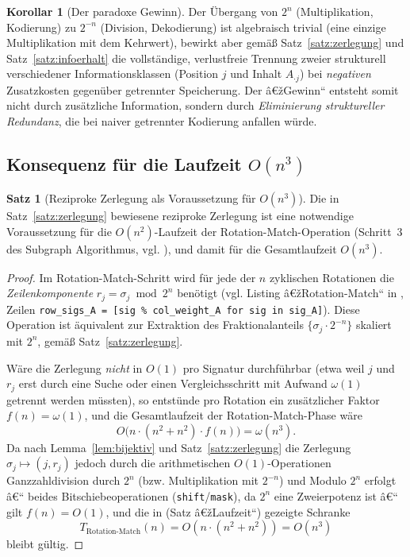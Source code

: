 ﻿\documentclass[a4paper,12pt]{article}
\theoremstyle{definition}
\newtheorem{satz}{Satz}
\newtheorem{korollar}{Korollar}
\begin{document}
\begin{korollar}[Der paradoxe Gewinn]
\label{kor:paradox}
	Der Übergang von $2^n$ (Multiplikation, Kodierung) zu $2^{-n}$
	(Division, Dekodierung) ist algebraisch trivial (eine einzige
	Multiplikation mit dem Kehrwert), bewirkt aber gemäß
	Satz~\ref{satz:zerlegung} und Satz~\ref{satz:infoerhalt} die vollständige,
	verlustfreie Trennung zweier strukturell verschiedener Informationsklassen
	(Position $j$ und Inhalt $A_{\cdot j}$) bei \emph{negativen} Zusatzkosten
	gegenüber getrennter Speicherung. Der â€žGewinn`` entsteht somit nicht durch
	zusätzliche Information, sondern durch \emph{Eliminierung struktureller
	Redundanz}, die bei naiver getrennter Kodierung anfallen würde.
\end{korollar}

\subsection{Konsequenz für die Laufzeit $O(n^3)$}

\begin{satz}[Reziproke Zerlegung als Voraussetzung für $O(n^3)$]
\label{satz:laufzeitkonsequenz}
	Die in Satz~\ref{satz:zerlegung} bewiesene reziproke Zerlegung ist eine
	notwendige Voraussetzung für die $O(n^2)$-Laufzeit der
	Rotation-Match-Operation (Schritt~3 des Subgraph Algorithmus, vgl.
	\cite{epp2026subgraph}), und damit für die Gesamtlaufzeit $O(n^3)$.
\end{satz}

\begin{proof}
	Im Rotation-Match-Schritt wird für jede der $n$ zyklischen Rotationen die
	\emph{Zeilenkomponente} $r_j = \sigma_j \bmod 2^n$ benötigt (vgl. Listing
	â€žRotation-Match`` in \cite{epp2026subgraph}, Zeilen \texttt{row\_sigs\_A
	= [sig \% col\_weight\_A for sig in sig\_A]}). Diese Operation ist
	äquivalent zur Extraktion des Fraktionalanteils $\{\sigma_j\cdot2^{-n}\}$
	skaliert mit $2^n$, gemäß Satz~\ref{satz:zerlegung}.

	Wäre die Zerlegung \emph{nicht} in $O(1)$ pro Signatur durchführbar
	(etwa weil $j$ und $r_j$ erst durch eine Suche oder einen
	Vergleichsschritt mit Aufwand $\omega(1)$ getrennt werden müssten),
	so entstünde pro Rotation ein zusätzlicher Faktor $f(n) = \omega(1)$,
	und die Gesamtlaufzeit der Rotation-Match-Phase wäre
	\[
		O\bigl(n \cdot (n^2 + n^2)\cdot f(n)\bigr) = \omega(n^3).
	\]
	Da nach Lemma~\ref{lem:bijektiv} und Satz~\ref{satz:zerlegung} die
	Zerlegung $\sigma_j \mapsto (j, r_j)$ jedoch durch die arithmetischen
	$O(1)$-Operationen Ganzzahldivision durch $2^n$ (bzw. Multiplikation mit
	$2^{-n}$) und Modulo $2^n$ erfolgt â€“ beides Bitschiebeoperationen
	(\texttt{shift}/\texttt{mask}), da $2^n$ eine Zweierpotenz ist â€“ gilt
	$f(n) = O(1)$, und die in \cite{epp2026subgraph} (Satz â€žLaufzeit``)
	gezeigte Schranke
	\[
		T_{\text{Rotation-Match}}(n) = O(n\cdot(n^2+n^2)) = O(n^3)
	\]
	bleibt gültig. \qedhere
\end{proof}
\end{document}
